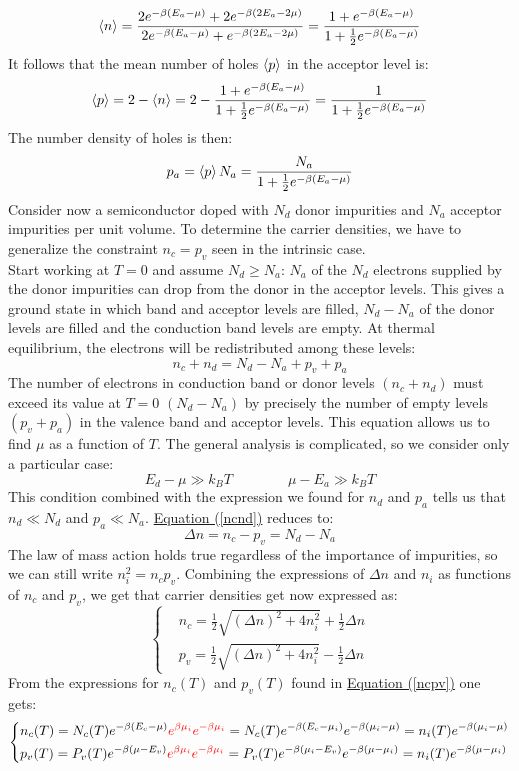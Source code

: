 \documentclass[10.75pt,a4paper,openright,bottom=2cm]{article}
\renewcommand{\refeq}[1]{\hyperref[#1]{Equation (\ref{#1})}}
\begin{document}
\[
\Braket{n}=\frac{2e^{-\beta(E_a-\mu)}+2e^{-\beta(2E_a-2\mu)}}{2e^{-\beta(E_a-\mu)}+e^{-\beta(2E_a-2\mu)}}=\frac{1+e^{-\beta(E_a-\mu)}}{1+\frac{1}{2}e^{-\beta(E_a-\mu)}}
\]
It follows that the mean number of holes $\Braket{p}$ in the acceptor level is:
\[
\Braket{p}=2-\Braket{n}=2-\frac{1+e^{-\beta(E_a-\mu)}}{1+\frac{1}{2}e^{-\beta(E_a-\mu)}}=\frac{1}{1+\frac{1}{2}e^{-\beta(E_a-\mu)}}
\]
The number density of holes is then:
\[
p_a=\Braket{p}N_a=\frac{N_a}{1+\frac{1}{2}e^{-\beta(E_a-\mu)}}
\]
Consider now a semiconductor doped with $N_d$ donor impurities and $N_a$ acceptor impurities per unit volume. To determine the carrier densities, we have to generalize the constraint $n_c=p_v$ seen in the intrinsic case.\\
Start working at $T=0$ and assume $N_d\ge N_a$: $N_a$ of the $N_d$ electrons supplied by the donor impurities can drop from the donor in the acceptor levels. This gives a ground state in which band and acceptor levels are filled, $N_d-N_a$ of the donor levels are filled and the conduction band levels are empty. At thermal equilibrium, the electrons will be redistributed among these levels:
\begin{equation}
\label{ncnd}
n_c+n_d=N_d-N_a+p_v+p_a
\end{equation}
The number of electrons in conduction band or donor levels $(n_c+n_d)$ must exceed its value at $T=0$ $(N_d-N_a)$ by precisely the number of empty levels $(p_v+p_a)$ in the valence band and acceptor levels. This equation allows us to find $\mu$ as a function of $T$. The general analysis is complicated, so we consider only a particular case:
\[
E_d-\mu\gg k_BT \qquad \qquad \mu-E_a\gg k_BT
\]
This condition combined with the expression we found for $n_d$ and $p_a$ tells us that $n_d\ll N_d$ and $p_a\ll N_a$. \refeq{ncnd} reduces to:
\[
\Delta n=n_c-p_v=N_d-N_a
\]
The law of mass action holds true regardless of the importance of impurities, so we can still write $n_i^2=n_cp_v$. Combining the expressions of $\Delta n$ and $n_i$ as functions of $n_c$ and $p_v$, we get that carrier densities get now expressed as:
\[
\left\{
\begin{aligned}
&n_c=\frac{1}{2}\sqrt{(\Delta n)^2+4n_i^2}+\frac{1}{2}\Delta n\\
&p_v=\frac{1}{2}\sqrt{(\Delta n)^2+4n_i^2}-\frac{1}{2}\Delta n
\end{aligned}
\right.
\]
From the expressions for $n_c(T)$ and $p_v(T)$ found in \refeq{ncpv} one gets:
\[
\left\{
\begin{aligned}
&n_c(T)=N_c(T)e^{-\beta(E_c-\mu)}{\color{red}{e^{\beta\mu_i}e^{-\beta\mu_i}}}=N_c(T)e^{-\beta(E_c-\mu_i)}e^{-\beta(\mu_i-\mu)}=n_i(T)e^{-\beta(\mu_i-\mu)}\\
&p_v(T)=P_v(T)e^{-\beta(\mu-E_v)}{\color{red}{e^{\beta\mu_i}e^{-\beta\mu_i}}}=P_v(T)e^{-\beta(\mu_i-E_v)}e^{-\beta(\mu-\mu_i)}=n_i(T)e^{-\beta(\mu-\mu_i)}
\end{aligned}
\right.
\]
\end{document}
